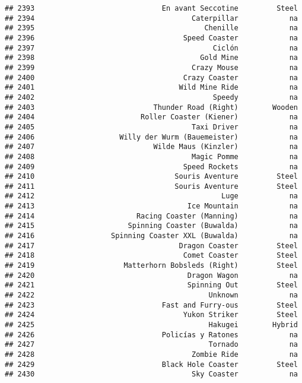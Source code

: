 \documentclass[
]{article}
\begin{document}
\begin{verbatim}
## 2393                              En avant Seccotine         Steel
## 2394                                     Caterpillar            na
## 2395                                        Chenille            na
## 2396                                   Speed Coaster            na
## 2397                                          Ciclón            na
## 2398                                       Gold Mine            na
## 2399                                     Crazy Mouse            na
## 2400                                   Crazy Coaster            na
## 2401                                  Wild Mine Ride            na
## 2402                                          Speedy            na
## 2403                            Thunder Road (Right)        Wooden
## 2404                         Roller Coaster (Kiener)            na
## 2405                                     Taxi Driver            na
## 2406                    Willy der Wurm (Bauemeister)            na
## 2407                            Wilde Maus (Kinzler)            na
## 2408                                     Magic Pomme            na
## 2409                                   Speed Rockets            na
## 2410                                 Souris Aventure         Steel
## 2411                                 Souris Aventure         Steel
## 2412                                            Luge            na
## 2413                                    Ice Mountain            na
## 2414                        Racing Coaster (Manning)            na
## 2415                      Spinning Coaster (Buwalda)            na
## 2416                  Spinning Coaster XXL (Buwalda)            na
## 2417                                  Dragon Coaster         Steel
## 2418                                   Comet Coaster         Steel
## 2419                     Matterhorn Bobsleds (Right)         Steel
## 2420                                    Dragon Wagon            na
## 2421                                    Spinning Out         Steel
## 2422                                         Unknown            na
## 2423                              Fast and Furry-ous         Steel
## 2424                                   Yukon Striker         Steel
## 2425                                         Hakugei        Hybrid
## 2426                              Policías y Ratones            na
## 2427                                         Tornado            na
## 2428                                     Zombie Ride            na
## 2429                              Black Hole Coaster         Steel
## 2430                                     Sky Coaster            na

\end{verbatim}
\end{document}
